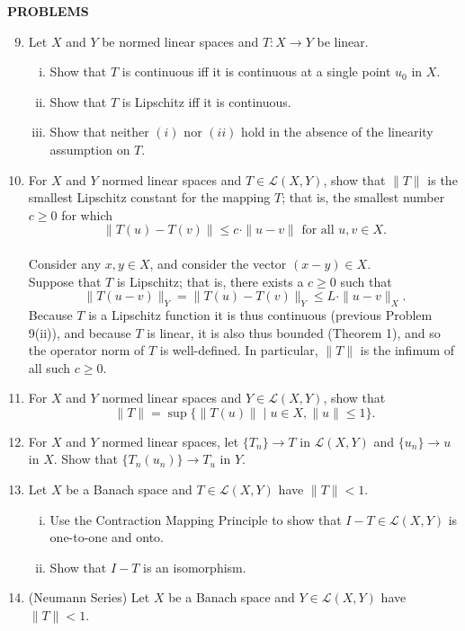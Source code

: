\begin{center}
	\textbf{PROBLEMS}
\end{center}
\begin{enumerate}
	\setcounter{enumi}{8}
    \item Let $X$ and $Y$ be normed linear spaces and $T:X\to Y$ be linear.
    \begin{enumerate}[(i)]
        \item Show that $T$ is continuous iff it is continuous at a single point $u_0$ in $X$.
        \item Show that $T$ is Lipschitz iff it is continuous.
        \item Show that neither $(i)$ nor $(ii)$ hold in the absence of the linearity assumption on $T$. 
    \end{enumerate}
    \item For $X$ and $Y$ normed linear spaces and $T\in\mathcal{L}(X,Y)$, show that $\|T\|$ is the smallest Lipschitz constant for the mapping $T$; that is, the smallest number $c\ge0$ for which
    \[
        \|T(u)-T(v)\|\le c\cdot\|u-v\|\text{ for all }u,v\in X.
    \]
    \\Consider any $x,y\in X$, and consider the vector $(x-y)\in X$.
    \\Suppose that $T$ is Lipschitz; that is, there exists a $c\ge0$ such that 
    \[
        \|T(u-v)\|_Y=\|T(u)-T(v)\|_Y\le L\cdot\|u-v\|_X.
    \]
    Because $T$ is a Lipschitz function it is thus continuous (previous Problem 9(ii)), and because $T$ is linear, it is also thus bounded (Theorem 1), and so the operator norm of $T$ is well-defined.
    In particular, $\|T\|$ is the infimum of all such $c\ge0$.
    \item For $X$ and $Y$ normed linear spaces and $Y\in\mathcal{L}(X,Y)$, show that 
    \[
        \|T\|=\sup\{\|T(u)\|\mid u\in X, \|u\|\le1\}.
    \]
    \item For $X$ and $Y$ normed linear spaces, let $\{T_n\}\to T$ in $\mathcal{L}(X,Y)$ and $\{u_n\}\to u$ in $X$.
    Show that $\{T_n(u_n)\}\to T_u$ in $Y$.
    \item Let $X$ be a Banach space and $T\in\mathcal{L}(X,Y)$ have $\|T\|<1$.
    \begin{enumerate}[(i)]
        \item Use the Contraction Mapping Principle to show that $I-T\in\mathcal{L}(X,Y)$ is one-to-one and onto.
        \item Show that $I-T$ is an isomorphism.
    \end{enumerate}
    \item (Neumann Series) Let $X$ be a Banach space and $Y\in\mathcal{L}(X,Y)$ have $\|T\|<1$.

\end{enumerate}
